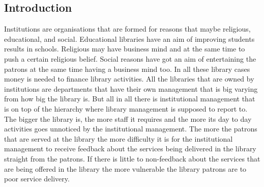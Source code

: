 \documentclass[12pt]{report}
\begin{document}
	\subsection{Introduction}
	Institutions are organisations that are formed for reasons that maybe religious, educational, and social. Educational libraries have an aim of improving students results in schools. Religious may have business mind and at the same time to push a certain religious belief. Social reasons have got an aim of entertaining the patrons at the same time having a business mind too. In all these library cases money is needed to finance library activities. All the libraries that are owned by institutions are departments that have their own management that is big varying from how big the library is. But all in all there is institutional management that is on top of the hierarchy where library management is supposed to report to.  The bigger the library is, the more staff it requires and the more its day to day activities goes unnoticed by the institutional management. The more the patrons that are served at the library the more difficulty it is for the institutional management to receive feedback about the services being delivered in the library straight from the patrons. If there is little to non-feedback about the services that are being offered in the library the more vulnerable the library patrons are to poor service delivery.\\
	
\end{document}
